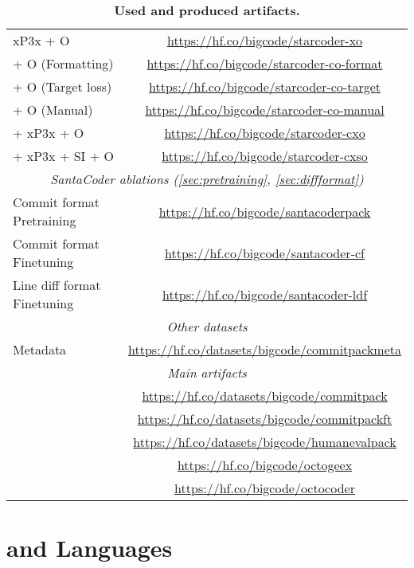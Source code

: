 \begin{table*}[htbp]
{\begin{tabular}{l|c}
    xP3x + O & \url{https://hf.co/bigcode/starcoder-xo} \\
    \dataft{} + O (Formatting) & \url{https://hf.co/bigcode/starcoder-co-format} \\
    \dataft{} + O (Target loss) & \url{https://hf.co/bigcode/starcoder-co-target} \\
    \dataft{} + O (Manual) & \url{https://hf.co/bigcode/starcoder-co-manual} \\
    \dataft{} + xP3x + O & \url{https://hf.co/bigcode/starcoder-cxo} \\
    \dataft{} + xP3x + SI + O & \url{https://hf.co/bigcode/starcoder-cxso} \\
    \midrule
    \multicolumn{2}{c}{\textit{SantaCoder ablations  (\autoref{sec:pretraining}, \autoref{sec:diffformat})}} \\
    \midrule
    Commit format Pretraining & \url{https://hf.co/bigcode/santacoderpack} \\
    Commit format Finetuning & \url{https://hf.co/bigcode/santacoder-cf} \\
    Line diff format Finetuning & \url{https://hf.co/bigcode/santacoder-ldf} \\
    \midrule
    \multicolumn{2}{c}{\textit{Other datasets}} \\
    \midrule
    \data{} Metadata & \url{https://hf.co/datasets/bigcode/commitpackmeta} \\    
    \midrule
    \multicolumn{2}{c}{\textit{Main artifacts}} \\    
    \midrule
    \data{} & \url{https://hf.co/datasets/bigcode/commitpack} \\
    \dataft{} & \url{https://hf.co/datasets/bigcode/commitpackft} \\
    \eval{} & \url{https://hf.co/datasets/bigcode/humanevalpack} \\
    \modelx{} & \url{https://hf.co/bigcode/octogeex} \\
    \model{} & \url{https://hf.co/bigcode/octocoder} \\
    \bottomrule
    \end{tabular}
    }
    \caption{
        \textbf{Used and produced artifacts.}
    }
    \label{tab:artifacts}
\end{table*}

\FloatBarrier
\newpage


\section{\data{} and \dataft{} Languages}
\label{sec:dataapp}

